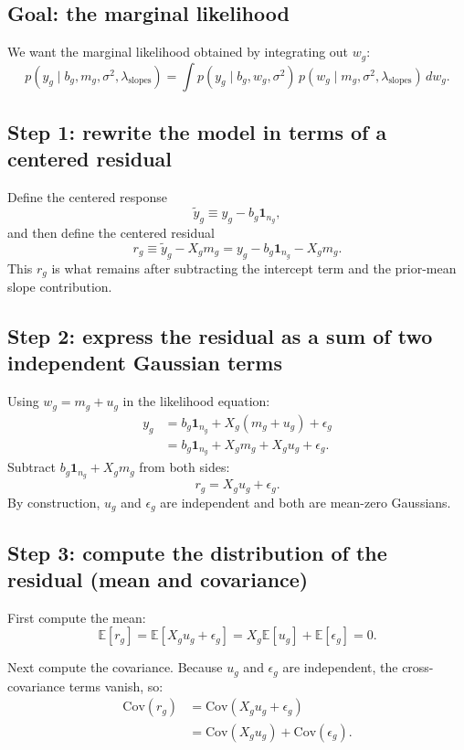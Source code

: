 \documentclass[11pt]{article}
\begin{document}
\subsection{Goal: the marginal likelihood}

We want the marginal likelihood obtained by integrating out $w_g$:
\[
  p(y_g \mid b_g,m_g,\sigma^2,\lambda_{\mathrm{slopes}})
  = \int p(y_g \mid b_g,w_g,\sigma^2)\,p(w_g \mid m_g,\sigma^2,\lambda_{\mathrm{slopes}})\,dw_g.
\]

\subsection{Step 1: rewrite the model in terms of a centered residual}

Define the centered response
\[
  \tilde{y}_g \equiv y_g - b_g \mathbf{1}_{n_g},
\]
and then define the centered residual
\[
  r_g \equiv \tilde{y}_g - X_g m_g = y_g - b_g \mathbf{1}_{n_g} - X_g m_g.
\]
This $r_g$ is what remains after subtracting the intercept term and the prior-mean slope contribution.

\subsection{Step 2: express the residual as a sum of two independent Gaussian terms}

Using $w_g=m_g+u_g$ in the likelihood equation:
\begin{align*}
  y_g
  &= b_g \mathbf{1}_{n_g} + X_g (m_g + u_g) + \epsilon_g \\
  &= b_g \mathbf{1}_{n_g} + X_g m_g + X_g u_g + \epsilon_g.
\end{align*}
Subtract $b_g\mathbf{1}_{n_g}+X_g m_g$ from both sides:
\[
  r_g = X_g u_g + \epsilon_g.
\]
By construction, $u_g$ and $\epsilon_g$ are independent and both are mean-zero Gaussians.

\subsection{Step 3: compute the distribution of the residual (mean and covariance)}

First compute the mean:
\[
  \mathbb{E}[r_g] = \mathbb{E}[X_g u_g + \epsilon_g] = X_g \mathbb{E}[u_g] + \mathbb{E}[\epsilon_g] = 0.
\]

Next compute the covariance. Because $u_g$ and $\epsilon_g$ are independent, the cross-covariance terms vanish, so:
\begin{align*}
  \mathrm{Cov}(r_g)
  &= \mathrm{Cov}(X_g u_g + \epsilon_g) \\
  &= \mathrm{Cov}(X_g u_g) + \mathrm{Cov}(\epsilon_g).
\end{align*}
\end{document}
